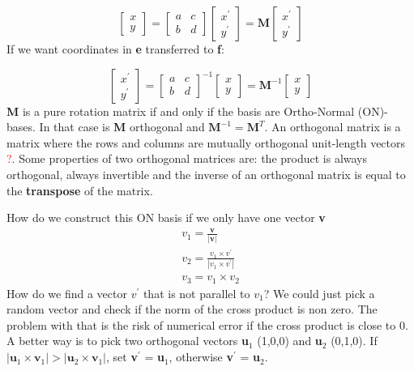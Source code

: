 		\begin{equation}
			\begin{bmatrix} x \\ y \end{bmatrix} =
			\begin{bmatrix} a& c \\b& d \end{bmatrix}
			\begin{bmatrix} x^{\prime} \\ y^{\prime} \end{bmatrix} = \textbf{M} \begin{bmatrix} x^{\prime} \\ y^{\prime} \end{bmatrix}
		\end{equation}
	If we want coordinates in \textbf{e} transferred to \textbf{f}:

		\begin{equation}
			\begin{bmatrix} x^{\prime} \\ y^{\prime} \end{bmatrix} =
			\begin{bmatrix} a& c \\b& d \end{bmatrix}^{-1}
			\begin{bmatrix} x \\ y \end{bmatrix} = \textbf{M}^{-1} \begin{bmatrix} x \\ y \end{bmatrix}		
		\end{equation}
	\textbf{M} is a pure rotation matrix if and only if the basis are Ortho-Normal (ON)-bases. In that case is \textbf{M} orthogonal and $\textbf{M}^{-1}=\textbf{M}^{T}$. An orthogonal matrix is a matrix where the rows and columns are mutually orthogonal unit-length vectors \textcolor{red}{?}. Some properties of two orthogonal matrices are: the product is always orthogonal, always invertible and the inverse of an orthogonal matrix is equal to the \textbf{transpose} of the matrix. 

	\noindent How do we construct this ON basis if we only have one vector \textbf{v}
		\begin{equation}
		\begin{aligned}
			v_1 = \frac{\textbf{v}} {|\textbf{v}|} 	 \\
			v_2 = \frac{v_1 \times v^{\prime}} {|v_1 \times v^{\prime}|} \\
			v_3 = v_1 \times v_2 
		\end{aligned}
		\end{equation}
	How do we find a vector $v^{\prime}$ that is not parallel to $v_1$? We could just pick a random vector and check if the norm of the cross product is non zero. The problem with that is the risk of numerical error if the cross product is close to 0. A better way is to pick two orthogonal vectors \textbf{u}$_1$ (1,0,0) and \textbf{u}$_2$ (0,1,0). If $|\textbf{u}_1 \times \textbf{v}_1| > |\textbf{u}_2 \times \textbf{v}_1|$, set \textbf{v}$^\prime$ = \textbf{u}$_1$, otherwise \textbf{v}$^\prime$ = \textbf{u}$_2$.


